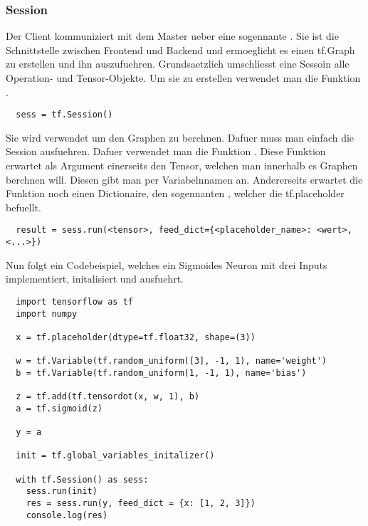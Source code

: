 \subsubsection{Session}
Der Client kommuniziert mit dem Master ueber eine sogennante
.
Sie ist die Schnittstelle zwischen Frontend und Backend und ermoeglicht es einen tf.Graph
zu erstellen und ihn auszufuehren. Grundsaetzlich umschliesst eine Sessoin alle
Operation- und Tensor-Objekte. Um sie zu erstellen verwendet man die Funktion .
\begin{verbatim}
  sess = tf.Session()
\end{verbatim}
\para{}
Sie wird verwendet um den Graphen zu berchnen. Dafuer muss man einfach die
Session ausfuehren. Dafuer verwendet man die Funktion
.
Diese Funktion erwartet als Argument einerseits den Tensor, welchen man
innerhalb es Graphen berchnen will. Diesen gibt man per Variabelnnamen an.
Andererseits erwartet die Funktion noch einen Dictionaire, den sogennanten
, welcher die tf.placeholder befuellt.
\begin{verbatim}
  result = sess.run(<tensor>, feed_dict={<placeholder_name>: <wert>, <...>})
\end{verbatim}

Nun folgt ein Codebeispiel, welches ein Sigmoides Neuron mit drei Inputs
implementiert, initalisiert und ausfuehrt.
\begin{verbatim}
  import tensorflow as tf
  import numpy

  x = tf.placeholder(dtype=tf.float32, shape=(3))

  w = tf.Variable(tf.random_uniform([3], -1, 1), name='weight')
  b = tf.Variable(tf.random_uniform(1, -1, 1), name='bias')

  z = tf.add(tf.tensordot(x, w, 1), b)
  a = tf.sigmoid(z)

  y = a

  init = tf.global_variables_initalizer()

  with tf.Session() as sess:
    sess.run(init)
    res = sess.run(y, feed_dict = {x: [1, 2, 3]})
    console.log(res)
\end{verbatim}

